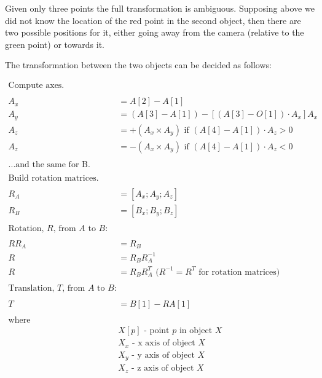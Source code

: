 Given only three points the full transformation is ambiguous. Supposing above we did not know the location of the red point in the second object, then there are two possible positions for it, either going away from the camera (relative to the green point) or towards it.

The transformation between the two objects can be decided as follows\cite{pointregistration}:

\begin{align*}
          \text{Compute axes.} \nonumber \\
          \nonumber \\
  A_x & = A[2] - A[1] \nonumber \\
  A_y & = (A[3] - A[1]) - [(A[3] - O[1]) \cdot A_x]A_x \nonumber \\
  A_z & = +(A_x \times A_y) \text{ if } (A[4] - A[1]) \cdot A_z > 0\nonumber \\  
  A_z & = -(A_x \times A_y) \text{ if } (A[4] - A[1]) \cdot A_z < 0\nonumber \\
          \nonumber \\
          \text{...and the same for B.} \nonumber \\
          \nonumber \\
          \text{Build rotation matrices.} \nonumber \\
          \nonumber \\
  R_A & = [A_x; A_y; A_z] \nonumber \\
  R_B & = [B_x; B_y; B_z] \nonumber \\
          \nonumber \\
          \text{Rotation, $R$, from $A$ to $B$:} \nonumber \\
          \nonumber \\
  R R_A & = R_B \nonumber \\
  R & = R_B R_A^{-1} \nonumber \\
  R & = R_B R_A^T \text{ ($R^{-1} = R^T$ for rotation matrices)} \nonumber \\
          \nonumber \\
          \text{Translation, $T$, from $A$ to $B$:} \nonumber \\
          \nonumber \\
  T & = B[1] - R A[1] \nonumber \\
          \nonumber \\
  \text{where}& \\
  & X[p] \text{ - point $p$ in object $X$} \nonumber \\
  & X_x \text{ - x axis of object $X$} \nonumber \\
  & X_y \text{ - y axis of object $X$} \nonumber \\
  & X_z \text{ - z axis of object $X$} \nonumber        
\end{align*}

